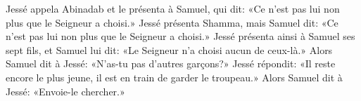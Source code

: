 Jessé appela Abinadab et le présenta à Samuel, qui dit:
	«Ce n’est pas lui non plus que le Seigneur a choisi.»
Jessé présenta Shamma, mais Samuel dit:
	«Ce n’est pas lui non plus que le Seigneur a choisi.»
Jessé présenta ainsi à Samuel ses sept fils, et Samuel lui dit:
	«Le Seigneur n’a choisi aucun de ceux-là.»
Alors Samuel dit à Jessé:
	«N’as-tu pas d’autres garçons?»
Jessé répondit: «Il reste encore le plus jeune,
	il est en train de garder le troupeau.»
Alors Samuel dit à Jessé: «Envoie-le chercher.»

